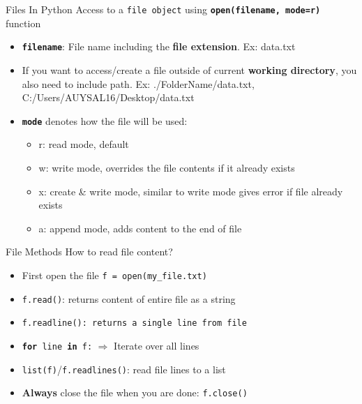     \begin{frame}{Files In Python}
        \LARGE
        Access to a \texttt{file object} using \texttt{\textbf{open(filename, mode=\textquotesingle r\textquotesingle )}} function        
        \begin{itemize}
            \Large
            \item \texttt{\textbf{filename}}: File name including the \textbf{file extension}. Ex: \textquotesingle data.txt\textquotesingle
            \pause
            \item If you want to access/create a file outside of current \textbf{working directory}, you also need to include path. Ex: \textquotesingle ./FolderName/data.txt\textquotesingle , \textquotesingle C:/Users/AUYSAL16/Desktop/data.txt\textquotesingle 
            \pause
            \item \textbf{\texttt{mode}} denotes how the file will be used:
            \pause
            \begin{itemize}
                \large
                \item \textquotesingle r\textquotesingle : read mode, default
                \pause
                \item \textquotesingle w\textquotesingle : write mode, overrides the file contents if it already exists
                \pause
                \item \textquotesingle x\textquotesingle : create \& write mode, similar to write mode gives error if file already exists
                \pause
                \item \textquotesingle a\textquotesingle : append mode, adds content to the end of file
            \end{itemize}
        \end{itemize}
    \end{frame}

    \begin{frame}{File Methods}
        \LARGE
        How to read file content?
        \begin{itemize}
            \pause
            \item First open the file \texttt{f = open(\textquotesingle my\_file.txt\textquotesingle)}
            \pause
            \item \texttt{f.read()}: returns content of entire file as a string
            \pause
            \item \texttt{f.readline(): returns a single line from file}
            \pause
            \item \texttt{\textbf{for} line \textbf{in} f:} $\Rightarrow$ Iterate over all lines
            \pause
            \item \texttt{list(f)}/\texttt{f.readlines()}: read file lines to a list
            \pause
            \item \textbf{Always} close the file when you are done: \texttt{f.close()}
        \end{itemize}        
    \end{frame}

